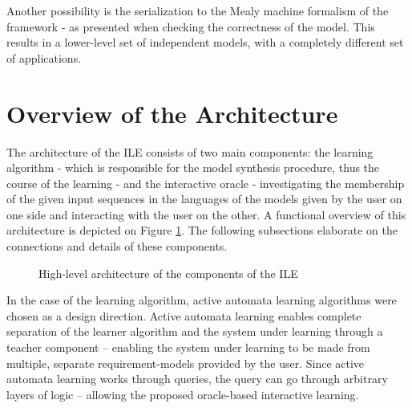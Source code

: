 Another possibility is the serialization to the Mealy machine formalism of the framework - as presented when checking the correctness of the model. This results in a lower-level set of independent models, with a completely different set of applications.

\clearpage
\section{Overview of the Architecture} \label{sec_architecture}

The architecture of the ILE consists of two main components: the learning algorithm - which is responsible for the model synthesis procedure, thus the course of the learning - and the interactive oracle - investigating the membership of the given input sequences in the languages of the models given by the user on one side and interacting with the user on the other. A functional overview of this architecture is depicted on Figure \ref{fig_architcture_informaloverview}. The following subsections elaborate on the connections and details of these components.

\begin{figure}[!ht] 
	\centering
	\caption{High-level architecture of the components of the ILE} 
	\label{fig_architcture_informaloverview}
\end{figure}

 In the case of the learning algorithm, active automata learning algorithms were chosen as a design direction. Active automata learning enables complete separation of the learner algorithm and the system under learning through a teacher component -- enabling the system under learning to be made from multiple, separate requirement-models provided by the user. Since active automata learning works through queries, the query can go through arbitrary layers of logic -- allowing the proposed oracle-based interactive learning.
 
